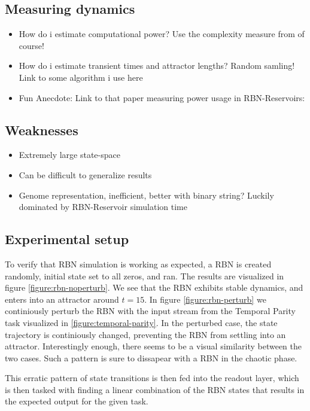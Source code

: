 \subsection{Measuring dynamics}

\begin{itemize}
  \item
    How do i estimate computational power?
    Use the complexity measure from \cite{rbn-reservoir} of course!
  \item
    How do i estimate transient times and attractor lengths?
    Random samling! Link to some algorithm i use here
  \item
    Fun Anecdote: Link to that paper measuring power usage in RBN-Reservoirs:
    \cite{rbn-reservoir-energy-efficiency}
\end{itemize}

\subsection{Weaknesses}

\begin{itemize}
  \item Extremely large state-space
  \item Can be difficult to generalize results
  \item
    Genome representation, inefficient, better with binary string?
    Luckily dominated by RBN-Reservoir simulation time
\end{itemize}


\subsection{Experimental setup}

To verify that RBN simulation is working as expected,
a RBN is created randomly, initial state set to all zeros, and ran.
The results are visualized in figure \ref{figure:rbn-noperturb}.
We see that the RBN exhibits stable dynamics, and enters into an attractor around $t=15$.
In figure \ref{figure:rbn-perturb} we continiously perturb the RBN with the input stream from the Temporal Parity task visualized in \ref{figure:temporal-parity}.
In the perturbed case, the state trajectory is continiously changed, preventing the RBN from settling into an attractor.
Interestingly enough, there seems to be a visual similarity between the two cases.
Such a pattern is sure to dissapear with a RBN in the chaotic phase.

This erratic pattern of state transitions is then fed into the readout layer,
which is then tasked with finding a linear combination of the RBN states that results in the expected output for the given task.

